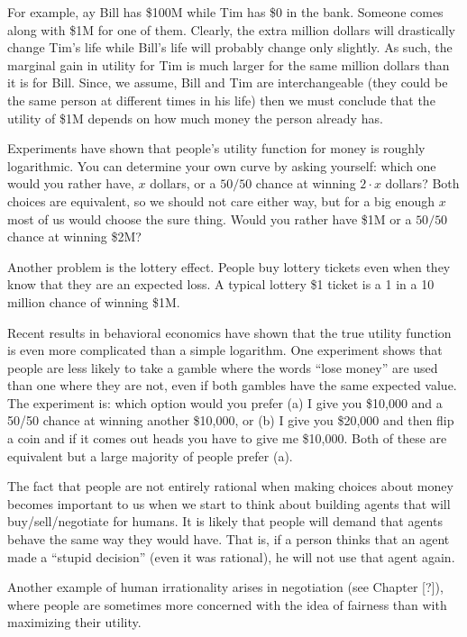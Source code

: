 For example, ay Bill has \$100M while Tim has \$0 in the bank. Someone
comes along with \$1M for one of them. Clearly, the extra million
dollars will drastically change Tim's life while Bill's life will
probably change only slightly. As such, the marginal gain in utility
for Tim is much larger for the same million dollars than it is for
Bill. Since, we assume, Bill and Tim are interchangeable (they could
be the same person at different times in his life) then we must
conclude that the utility of \$1M depends on how much money the person
already has.

Experiments have shown that people's utility function for money is
roughly logarithmic. You can determine your own curve by asking
yourself: which one would you rather have, $x$ dollars, or a $50/50$
chance at winning $2\cdot x$ dollars? Both choices are equivalent, so
we should not care either way, but for a big enough $x$ most of us
would choose the sure thing. Would you rather have \$1M or a $50/50$
chance at winning \$2M? 

Another problem is the lottery effect. People buy lottery tickets even
when they know that they are an expected loss. A typical lottery \$1
ticket is a 1 in a 10 million chance of winning \$1M. 

Recent results in behavioral economics have shown that the true
utility function is even more complicated than a simple logarithm. One
experiment shows that people are less likely to take a gamble where
the words ``lose money'' are used than one where they are not, even if
both gambles have the same expected value. The experiment is: which
option would you prefer (a) I give you \$10,000 and a 50/50 chance at
winning another \$10,000, or (b) I give you \$20,000 and then flip a
coin and if it comes out heads you have to give me \$10,000. Both of
these are equivalent but a large majority of people prefer (a).

The fact that people are not entirely rational when making choices
about money becomes important to us when we start to think about
building agents that will buy/sell/negotiate for humans. It is likely
that people will demand that agents behave the same way they would
have. That is, if a person thinks that an agent made a ``stupid
decision'' (even it was rational), he will not use that agent again.

Another example of human irrationality arises in negotiation (see
Chapter [?]), where people are sometimes more concerned with the idea
of fairness than with maximizing their utility.

